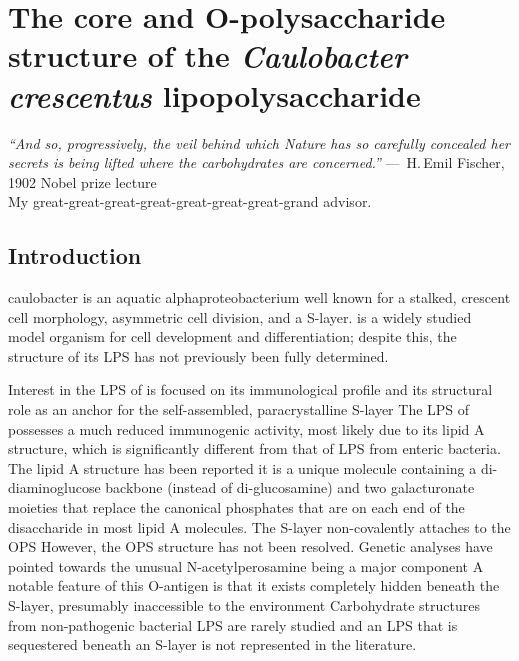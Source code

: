 \acresetall

\chapter{The core and O-polysaccharide structure of the \textit{Caulobacter crescentus} lipopolysaccharide}
\label{ch:lps}

\begin{epigraph}
\emph{``And so, progressively, the veil behind which Nature has so carefully concealed her secrets is being lifted where the carbohydrates are concerned.''} ---~H.\,Emil Fischer, 1902 Nobel prize lecture\\ My great-great-great-great-great-great-great-grand advisor.
\end{epigraph}

\section{Introduction} %
\label{sec:introduction} 
	\acl{caulobacter} is an aquatic alphaproteobacterium well known for a stalked, crescent cell morphology, asymmetric cell division, and a \ac{S-layer}. \caulobacter is a widely studied model organism for cell development and differentiation; despite this, the structure of its \ac{LPS} has not previously been fully determined.

	Interest in the \ac{LPS} of \caulobacter is focused on its immunological profile and its structural role as an anchor for the self-assembled, paracrystalline \ac{S-layer} The \ac{LPS} of \caulobacter possesses a much reduced immunogenic activity, most likely due to its lipid A structure, which is significantly different from that of \ac{LPS} from enteric bacteria. The lipid A structure has been reported it is a unique molecule containing a di-diaminoglucose backbone (instead of di-glucosamine) and two galacturonate moieties that replace the canonical phosphates that are on each end of the disaccharide in most lipid A molecules. The \caulobacter \ac{S-layer} non-covalently attaches to the \ac{OPS} However, the \ac{OPS} structure has not been resolved. Genetic analyses have pointed towards the unusual N-acetylperosamine being a major component A notable feature of this O-antigen is that it exists completely hidden beneath the S-layer, presumably inaccessible to the environment Carbohydrate structures from non-pathogenic bacterial \ac{LPS} are rarely studied and an \ac{LPS} that is sequestered beneath an \ac{S-layer} is not represented in the literature.

